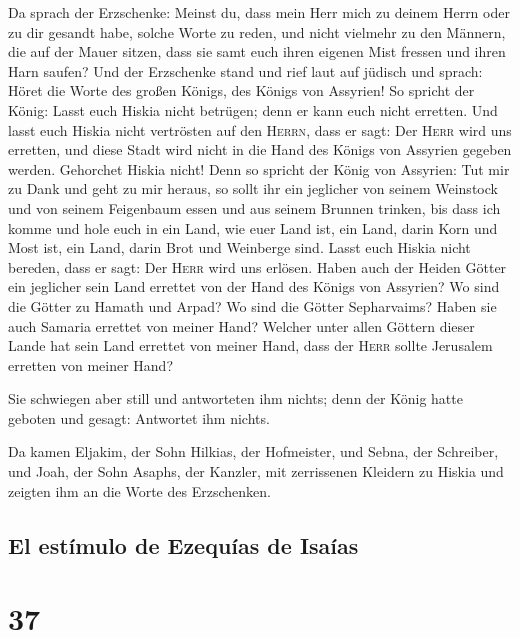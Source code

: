  Da sprach der Erzschenke: Meinst du, dass mein Herr mich
zu deinem Herrn oder zu dir gesandt habe, solche Worte zu reden, und
nicht vielmehr zu den Männern, die auf der Mauer sitzen, dass sie samt
euch ihren eigenen Mist fressen und ihren Harn saufen? 
Und der Erzschenke stand und rief laut auf jüdisch und sprach: Höret die
Worte des großen Königs, des Königs von Assyrien!  So
spricht der König: Lasst euch Hiskia nicht betrügen; denn er kann euch
nicht erretten.  Und lasst euch Hiskia nicht vertrösten
auf den \textsc{Herrn}, dass er sagt: Der \textsc{Herr} wird uns
erretten, und diese Stadt wird nicht in die Hand des Königs von Assyrien
gegeben werden.  Gehorchet Hiskia nicht! Denn so spricht
der König von Assyrien: Tut mir zu Dank und geht zu mir heraus, so sollt
ihr ein jeglicher von seinem Weinstock und von seinem Feigenbaum essen
und aus seinem Brunnen trinken,  bis dass ich komme und
hole euch in ein Land, wie euer Land ist, ein Land, darin Korn und Most
ist, ein Land, darin Brot und Weinberge sind.  Lasst euch
Hiskia nicht bereden, dass er sagt: Der \textsc{Herr} wird uns erlösen.
Haben auch der Heiden Götter ein jeglicher sein Land errettet von der
Hand des Königs von Assyrien?  Wo sind die Götter zu
Hamath und Arpad? Wo sind die Götter Sepharvaims? Haben sie auch Samaria
errettet von meiner Hand?  Welcher unter allen Göttern
dieser Lande hat sein Land errettet von meiner Hand, dass der
\textsc{Herr} sollte Jerusalem erretten von meiner Hand?

 Sie schwiegen aber still und antworteten ihm nichts;
denn der König hatte geboten und gesagt: Antwortet ihm nichts.

 Da kamen Eljakim, der Sohn Hilkias, der Hofmeister, und
Sebna, der Schreiber, und Joah, der Sohn Asaphs, der Kanzler, mit
zerrissenen Kleidern zu Hiskia und zeigten ihm an die Worte des
Erzschenken.

\hypertarget{el-estuxedmulo-de-ezequuxedas-de-isauxedas}{%
\subsection{El estímulo de Ezequías de
Isaías}\label{el-estuxedmulo-de-ezequuxedas-de-isauxedas}}

\hypertarget{section-36}{%
\section{37}\label{section-36}}

